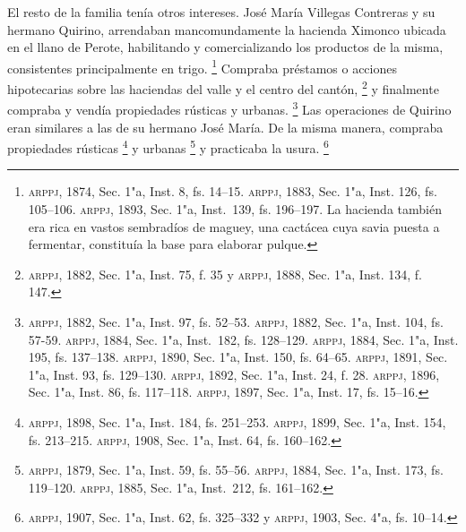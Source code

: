 \documentclass[14pt,twoside,final]{extbook} %
\let\oldfootnote\footnote
\renewcommand\footnote[1]{%
\oldfootnote{\hspace{1mm}#1}}
\begin{document}
El resto de la familia tenía otros intereses. José María Villegas Contreras y su hermano Quirino, arrendaban mancomundamente la hacienda Ximonco ubicada en el llano de Perote, habilitando y comercializando los productos de la misma, consistentes principalmente en trigo.\footnote{\textsc{arppj}, 1874, Sec. 1"a, Inst. 8, fs. 14--15. \textsc{arppj}, 1883, Sec. 1"a, Inst. 126, fs. 105--106. \textsc{arppj}, 1893, Sec. 1"a, Inst.~139, fs. 196--197. La hacienda\index[lugares]{Ximonco!hacienda} también era rica en vastos sembradíos de maguey, una cactácea cuya savia puesta a fermentar, constituía la base para elaborar pulque.} Compraba préstamos o acciones hipotecarias sobre las haciendas del valle y el centro del cantón,\footnote{\textsc{arppj}, 1882, Sec. 1"a, Inst. 75, f. 35 y \textsc{arppj}, 1888, Sec. 1"a, Inst. 134, f. 147.} y finalmente compraba y vendía propiedades rústicas y urbanas.\footnote{\textsc{arppj}, 1882, Sec. 1"a, Inst. 97, fs. 52--53. \textsc{arppj}, 1882, Sec. 1"a, Inst. 104, fs. 57-59. \textsc{arppj}, 1884, Sec. 1"a, Inst.~182, fs. 128--129. \textsc{arppj}, 1884, Sec. 1"a, Inst. 195, fs. 137--138. \textsc{arppj}, 1890, Sec. 1"a, Inst. 150, fs. 64--65. \textsc{arppj}, 1891, Sec. 1"a, Inst. 93, fs. 129--130. \textsc{arppj}, 1892, Sec. 1"a, Inst. 24, f. 28. \textsc{arppj}, 1896, Sec. 1"a, Inst. 86, fs. 117--118. \textsc{arppj}, 1897, Sec. 1"a, Inst. 17, fs. 15--16.} Las operaciones de Quirino eran similares a las de su hermano José María. De la misma manera, compraba propiedades rústicas\footnote{\textsc{arppj}, 1898, Sec. 1"a, Inst. 184, fs. 251--253. \textsc{arppj}, 1899, Sec. 1"a, Inst. 154, fs. 213--215. \textsc{arppj}, 1908, Sec. 1"a, Inst. 64, fs. 160--162.} y urbanas\footnote{\textsc{arppj}, 1879, Sec. 1"a, Inst. 59, fs. 55--56. \textsc{arppj}, 1884, Sec. 1"a, Inst. 173, fs. 119--120. \textsc{arppj}, 1885, Sec. 1"a, Inst.~212, fs. 161--162.} y practicaba la usura.\footnote{\textsc{arppj}, 1907, Sec. 1"a, Inst. 62, fs. 325--332 y \textsc{arppj}, 1903, Sec. 4"a, fs. 10--14.}
\end{document}

